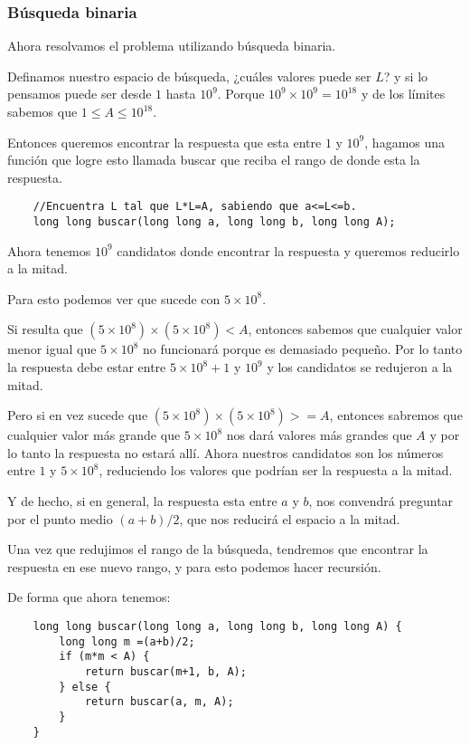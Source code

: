 \subsubsection*{Búsqueda binaria}
Ahora resolvamos el problema utilizando búsqueda binaria.

Definamos nuestro espacio de búsqueda, ¿cuáles valores puede ser \(L\)? y si lo pensamos puede ser desde \(1\) hasta \(10^9\). Porque \(10^9\times 10^9=10^{18}\) y de los límites sabemos que \(1\leq A\leq 10^{18}\).

Entonces queremos encontrar la respuesta que esta entre \(1\) y \(10^9\), hagamos una función que logre esto llamada buscar que reciba el rango de donde esta la respuesta.

\begin{lstlisting}
	//Encuentra L tal que L*L=A, sabiendo que a<=L<=b.
	long long buscar(long long a, long long b, long long A);
\end{lstlisting}

Ahora tenemos \(10^9\) candidatos donde encontrar la respuesta y queremos reducirlo a la mitad. 

Para esto podemos ver que sucede con \(5\times10^8\). 

Si resulta que \((5\times10^8)\times(5\times10^8) <A\), entonces sabemos que cualquier valor menor igual que \(5 \times 10^8\) no funcionará porque es demasiado pequeño. Por lo tanto la respuesta debe estar entre \(5\times 10^8 +1\) y \(10^9\) y los candidatos se redujeron a la mitad.

Pero si en vez sucede que \((5\times10^8)\times(5\times10^8) >=A\), entonces sabremos que cualquier valor más grande que \(5\times 10^8\) nos dará valores más grandes que \(A\) y por lo tanto la respuesta no estará allí. Ahora nuestros candidatos son los números entre \(1\) y \(5\times 10^8\), reduciendo los valores que podrían ser la respuesta a la mitad.

Y de hecho, si en general, la respuesta esta entre \(a\) y \(b\), nos convendrá preguntar por el punto medio \((a+b)/2\), que nos reducirá el espacio a la mitad.

Una vez que redujimos el rango de la búsqueda, tendremos que encontrar la respuesta en ese nuevo rango, y para esto podemos hacer recursión.

De forma que ahora tenemos:
\begin{lstlisting}
	long long buscar(long long a, long long b, long long A) {
		long long m =(a+b)/2;
		if (m*m < A) {
			return buscar(m+1, b, A);
		} else {
			return buscar(a, m, A);
		}
	} 
\end{lstlisting}

